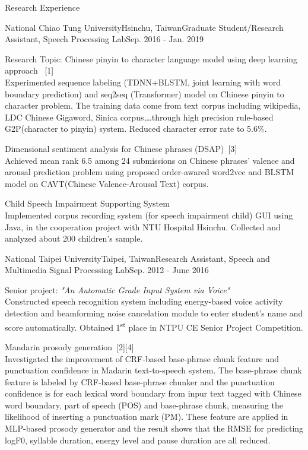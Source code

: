 \documentclass{resume} %
\newcommand{\ts}{\textsuperscript}
\begin{document}
\begin{rSection}{Research Experience}
    \begin{rSubsection}{National Chiao Tung University}{Hsinchu, Taiwan}{Graduate Student/Research Assistant, Speech Processing Lab}{Sep. 2016 - Jan. 2019}
        \item Research Topic: Chinese pinyin to character language model using deep learning approach ~[1]\\
        Experimented sequence labeling (TDNN+BLSTM, joint learning with word boundary prediction) and seq2seq (Transformer) model on Chinese pinyin to character problem. 
        The training data come from text corpus including wikipedia, LDC Chinese Gigaword, Sinica corpus,\dots through high precision rule-based G2P(character to pinyin) system.
        Reduced character error rate to 5.6\%.
        \item Dimensional sentiment analysis for Chinese phrases (DSAP)~[3] \\
        Achieved mean rank 6.5 among 24 submissions on Chinese phrases' valence and arousal prediction problem using proposed order-awared word2vec and BLSTM model on CAVT(Chinese Valence-Arousal Text) corpus.
        \item Child Speech Impairment Supporting System\\
        Implemented corpus recording system (for speech impairment child) GUI using Java, in the cooperation project with NTU Hospital Hsinchu. Collected and analyzed about 200 children's sample.
    \end{rSubsection}
    \begin{rSubsection}{National Taipei University}{Taipei, Taiwan}{Research Assistant, Speech and Multimedia Signal Processing Lab}{Sep. 2012 - June 2016}
        \item Senior project: {\em "An Automatic Grade Input System via Voice"}\\
        Constructed speech recognition system including energy-based voice activity detection and beamforming noise cancelation module to enter student's name and score automatically. Obtained 1\ts{st} place in NTPU CE Senior Project Competition.
        \item Mandarin prosody generation~[2][4]\\
        Investigated the improvement of CRF-based base-phrase chunk feature and punctuation confidence in Madarin text-to-speech system. 
        The base-phrase chunk feature is labeled by CRF-based base-phrase chunker 
        and the punctuation confidence is for each lexical word boundary from inpur text tagged with Chinese word boundary, part of speech (POS) and base-phrase chunk, 
        measuring the likelihood of inserting a punctuation mark (PM). 
        These feature are applied in MLP-based prosody generator and the result shows that the RMSE for predicting logF0, syllable duration, energy level and pause duration are all reduced.
    \end{rSubsection}
\end{rSection}
\end{document}

